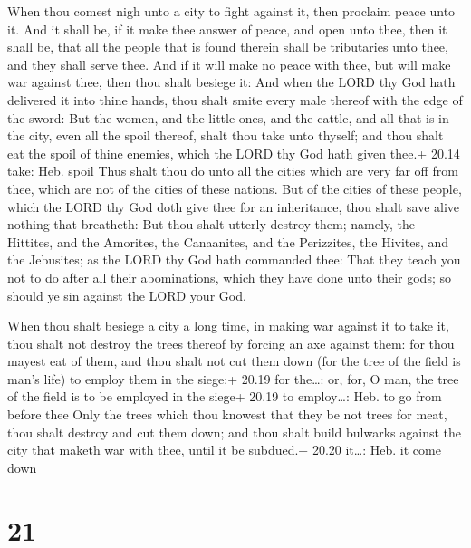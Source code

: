  When thou comest nigh unto a city to fight against it,
then proclaim peace unto it.  And it shall be, if it make
thee answer of peace, and open unto thee, then it shall be, that all the
people that is found therein shall be tributaries unto thee, and they
shall serve thee.  And if it will make no peace with thee,
but will make war against thee, then thou shalt besiege it:
 And when the LORD thy God hath delivered it into thine
hands, thou shalt smite every male thereof with the edge of the sword:
 But the women, and the little ones, and the cattle, and
all that is in the city, even all the spoil thereof, shalt thou take
unto thyself; and thou shalt eat the spoil of thine enemies, which the
LORD thy God hath given thee.+ 20.14 take: Heb. spoil  Thus
shalt thou do unto all the cities which are very far off from thee,
which are not of the cities of these nations.  But of the
cities of these people, which the LORD thy God doth give thee for an
inheritance, thou shalt save alive nothing that breatheth: 
But thou shalt utterly destroy them; namely, the Hittites, and the
Amorites, the Canaanites, and the Perizzites, the Hivites, and the
Jebusites; as the LORD thy God hath commanded thee:  That
they teach you not to do after all their abominations, which they have
done unto their gods; so should ye sin against the LORD your God.

 When thou shalt besiege a city a long time, in making
war against it to take it, thou shalt not destroy the trees thereof by
forcing an axe against them: for thou mayest eat of them, and thou shalt
not cut them down (for the tree of the field is man's life) to employ
them in the siege:+ 20.19 for the\ldots: or, for, O man, the tree of the
field is to be employed in the siege+ 20.19 to employ\ldots: Heb. to go
from before thee  Only the trees which thou knowest that
they be not trees for meat, thou shalt destroy and cut them down; and
thou shalt build bulwarks against the city that maketh war with thee,
until it be subdued.+ 20.20 it\ldots: Heb. it come down

\hypertarget{section-20}{%
\section{21}\label{section-20}}

